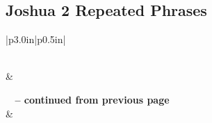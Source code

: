 \subsection{Joshua 2 Repeated Phrases}


\normalsize
 
\begin{center}
\begin{longtable}{|p{3.0in}|p{0.5in}|}
\caption[Joshua 2 Repeated Phrases]{Joshua 2 Repeated Phrases}\label{table:Repeated Phrases Joshua 2} \\
\hline {} &  \\ \hline 
\endfirsthead
 
{{\bfseries \tablename\ \thetable{} -- continued from previous page}} \\  
\hline {} &  \\ \hline 
\endhead
 

\end{longtable}
\end{center}
